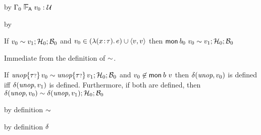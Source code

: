 \begin{lamportproof}
\begin{pfproof}
\begin{pfproof}
\begin{pfproof}
            \end{pfproof}
        \end{pfproof}
        \begin{pfproof}
          \absurdstep
            \begin{pfproof}
              by $\stypeenv_0 \sWLA \svalue_0 : \tdyn$
            \end{pfproof}
        \end{pfproof}
        \begin{pfproof}
          \qedstep
        \end{pfproof}
        \begin{pfproof}
          \absurdstep
            \begin{pfproof}
              by 
            \end{pfproof}
        \end{pfproof}
    \end{pfproof}
\end{lamportproof}

\begin{lemma}\label{AT-addmon}
  If\/ $v_0 \sim v_1; \mathcal{H}_0; \mathcal{B}_0$
  and\/ $v_0 \in (\lambda (x\!:\!\tau).\, e) \cup \langle v,v \rangle$
  then\/ $\mathsf{mon}^{}\,b_0~v_0 \sim v_1; \mathcal{H}_0; \mathcal{B}_0$
\end{lemma}
\begin{lamportproof}
  Immediate from the definition of $\sim$.
\end{lamportproof}

\begin{lemma}\label{AT-unop}
  If\/ $\textit{unop}{\{{\tau{\scriptstyle ?}}\}}\,v_0 \sim \textit{unop}{\{{\tau{\scriptstyle ?}}\}}\,v_1; \mathcal{H}_0; \mathcal{B}_0$
  and\/ $v_0 \not\in \mathsf{mon}^{}\,b~v$
  then\/ $\delta(\textit{unop}, v_0)$ is defined iff\/ $\delta(\textit{unop}, v_1)$
  is defined.
  Furthermore, if both are defined, then\/ $\delta(\textit{unop}, v_0) \sim \delta(\textit{unop}, v_1); \mathcal{H}_0; \mathcal{B}_0$
\end{lemma}
\begin{lamportproof}
    \begin{pfproof}
      by definition $\sim$
    \end{pfproof}
  \qedstep
    \begin{pfproof}
      by definition $\delta$
    \end{pfproof}
\end{lamportproof}

